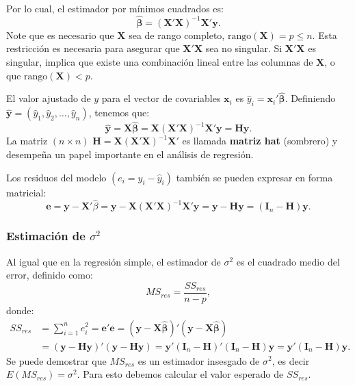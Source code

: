 \documentclass[
]{article}
\begin{document}
Por lo cual, el estimador por mínimos cuadrados es:
\[
\widehat{\boldsymbol \beta}= (\boldsymbol X'\boldsymbol X)^{-1}\boldsymbol X'\boldsymbol y.
\]
Note que es necesario que \(\boldsymbol X\) sea de rango completo, \(\mbox{rango}(\boldsymbol X) = p \leq n\). Esta restricción es necesaria para asegurar que \(\boldsymbol X'\boldsymbol X\) sea no singular. Si \(\boldsymbol X'\boldsymbol X\) es singular, implica que existe una combinación lineal entre las columnas de \(\boldsymbol X\), o que \(\mbox{rango}(\boldsymbol X) < p\).

El valor ajustado de \(y\) para el vector de covariables \(\boldsymbol x_{i}\) es \(\widehat{y}_{i}= \boldsymbol x_{i}'\widehat{\boldsymbol \beta}\). Definiendo \(\widehat{\boldsymbol y}= (\widehat{y}_{1},\widehat{y}_{2},\ldots,\widehat{y}_{n})\), tenemos que:
\[
\widehat{\boldsymbol y}= \boldsymbol X\widehat{\boldsymbol \beta}= \boldsymbol X(\boldsymbol X'\boldsymbol X)^{-1}\boldsymbol X'\boldsymbol y= \boldsymbol H\boldsymbol y.
\]
La matriz \((n\times n)\) \(\boldsymbol H= \boldsymbol X(\boldsymbol X'\boldsymbol X)^{-1}\boldsymbol X'\) es llamada \textbf{matriz hat} (sombrero) y desempeña un papel importante en el análisis de regresión.

Los residuos del modelo \((e_{i}=y_{i}-\widehat{y}_{i})\) también se pueden expresar en forma matricial:
\[
\boldsymbol e= \boldsymbol y- \boldsymbol X'\widehat{\beta}= \boldsymbol y- \boldsymbol X(\boldsymbol X'\boldsymbol X)^{-1}\boldsymbol X'\boldsymbol y= \boldsymbol y- \boldsymbol H\boldsymbol y= (\boldsymbol I_{n} - \boldsymbol H)\boldsymbol y.
\]

\hypertarget{estimaciuxf3n-de-sigma2-1}{%
\subsubsection{\texorpdfstring{Estimación de \(\sigma^{2}\)}{Estimación de \textbackslash sigma\^{}\{2\}}}\label{estimaciuxf3n-de-sigma2-1}}

Al igual que en la regresión simple, el estimador de \(\sigma^{2}\) es el cuadrado medio del error, definido como:
\[
MS_{res} = \frac{SS_{res}}{n-p},
\]
donde:
\begin{equation}
\begin{split}
SS_{res} &= \sum_{i=1}^{n}e^{2}_{i} = \boldsymbol e'\boldsymbol e= (\boldsymbol y- \boldsymbol X\widehat{\boldsymbol \beta})'(\boldsymbol y- \boldsymbol X\widehat{\boldsymbol \beta}) \\
&= (\boldsymbol y- \boldsymbol H\boldsymbol y)'(\boldsymbol y- \boldsymbol H\boldsymbol y) = \boldsymbol y'(\boldsymbol I_{n}-\boldsymbol H)'(\boldsymbol I_{n}-\boldsymbol H)\boldsymbol y= \boldsymbol y'(\boldsymbol I_{n} - \boldsymbol H)\boldsymbol y.
\end{split}
\nonumber
\end{equation}
Se puede demostrar que \(MS_{res}\) es un estimador insesgado de \(\sigma^{2}\), es decir \(E(MS_{res})=\sigma^{2}\). Para esto debemos calcular el valor esperado de \(SS_{res}\).
\end{document}
